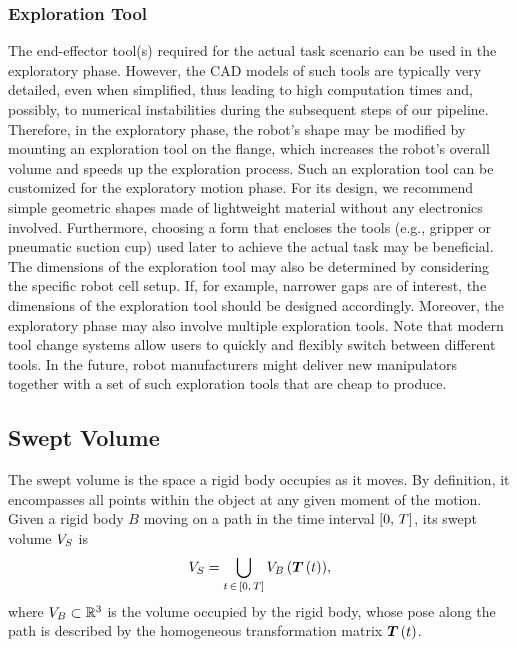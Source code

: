 \subsubsection{Exploration Tool}
The end-effector tool(s) required for the actual task scenario can be used in the exploratory phase. 
However, the CAD models of such tools are typically very detailed, 
even when simplified, 
thus leading to high computation times and, 
possibly, 
to numerical instabilities during the subsequent steps of our pipeline.
Therefore, in the exploratory phase, 
the robot's shape may be modified by mounting an exploration tool on the flange, 
which increases the robot's overall volume and speeds up the exploration process.
Such an exploration tool can be customized for the exploratory motion phase.
For its design, we recommend simple geometric shapes made of lightweight material without any electronics involved.
Furthermore, 
choosing a form that encloses the tools 
(e.g., gripper or pneumatic suction cup) used later to achieve the actual task may be beneficial.
The dimensions of the exploration tool may also be determined by considering the specific robot cell setup.
If, 
for example, 
narrower gaps are of interest,
the dimensions of the exploration tool should be designed accordingly. 
Moreover, 
the exploratory phase may also involve multiple exploration tools.
Note that modern tool change systems allow users to quickly and flexibly switch between different tools.
In the future, 
robot manufacturers might deliver new manipulators together with a set of such exploration tools that are cheap to produce.

\subsection{Swept Volume} %
\label{subsec:sweptVolume}
The swept volume is the space a rigid body occupies as it moves. 
By definition, 
it encompasses all points within the object at any given moment of the motion.
Given a rigid body $B$ moving on a path in the time interval ${\left[0,\thinspace T\right]}$,
its swept volume ${V_{S}}$ is %
\begin{equation}
	\label{eq:sweptVol}
	{V_{S}} = 
	\bigcup_{t\thinspace\in\thinspace{\left[0,\thinspace T\right]}}
	{V_{B}\left({{{\bm{T}\left({t}\right)}}}\right)},
\end{equation}
where ${V_{B}}\subset\mathbb{R}^{3}$ is the volume occupied by the rigid body,  whose pose along the path is described by the homogeneous transformation matrix ${\bm{T}\left({t}\right)}$. %

